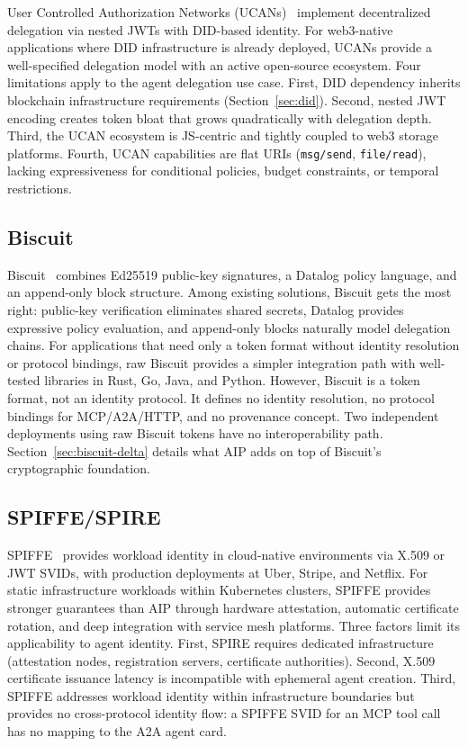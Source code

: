 \documentclass[11pt,a4paper]{article}
\newcommand{\aip}{\textsc{AIP}}
\newcommand{\atoa}{\textsc{A2A}}
\newcommand{\mcp}{\textsc{MCP}}
\begin{document}
User Controlled Authorization Networks (UCANs)~\citep{ucan2024spec} implement decentralized delegation via nested JWTs with DID-based identity. For web3-native applications where DID infrastructure is already deployed, UCANs provide a well-specified delegation model with an active open-source ecosystem. Four limitations apply to the agent delegation use case. First, DID dependency inherits blockchain infrastructure requirements (Section~\ref{sec:did}). Second, nested JWT encoding creates token bloat that grows quadratically with delegation depth. Third, the UCAN ecosystem is JS-centric and tightly coupled to web3 storage platforms. Fourth, UCAN capabilities are flat URIs (\texttt{msg/send}, \texttt{file/read}), lacking expressiveness for conditional policies, budget constraints, or temporal restrictions.

\subsection{Biscuit}
\label{sec:biscuit}

Biscuit~\citep{biscuit2024spec} combines Ed25519 public-key signatures, a Datalog policy language, and an append-only block structure. Among existing solutions, Biscuit gets the most right: public-key verification eliminates shared secrets, Datalog provides expressive policy evaluation, and append-only blocks naturally model delegation chains. For applications that need only a token format without identity resolution or protocol bindings, raw Biscuit provides a simpler integration path with well-tested libraries in Rust, Go, Java, and Python. However, Biscuit is a token format, not an identity protocol. It defines no identity resolution, no protocol bindings for \mcp{}/\atoa{}/HTTP, and no provenance concept. Two independent deployments using raw Biscuit tokens have no interoperability path. Section~\ref{sec:biscuit-delta} details what \aip{} adds on top of Biscuit's cryptographic foundation.

\subsection{SPIFFE/SPIRE}
\label{sec:spiffe}

SPIFFE~\citep{spiffe2024} provides workload identity in cloud-native environments via X.509 or JWT SVIDs, with production deployments at Uber, Stripe, and Netflix. For static infrastructure workloads within Kubernetes clusters, SPIFFE provides stronger guarantees than \aip{} through hardware attestation, automatic certificate rotation, and deep integration with service mesh platforms. Three factors limit its applicability to agent identity. First, SPIRE requires dedicated infrastructure (attestation nodes, registration servers, certificate authorities). Second, X.509 certificate issuance latency is incompatible with ephemeral agent creation. Third, SPIFFE addresses workload identity within infrastructure boundaries but provides no cross-protocol identity flow: a SPIFFE SVID for an \mcp{} tool call has no mapping to the \atoa{} agent card.
\end{document}
